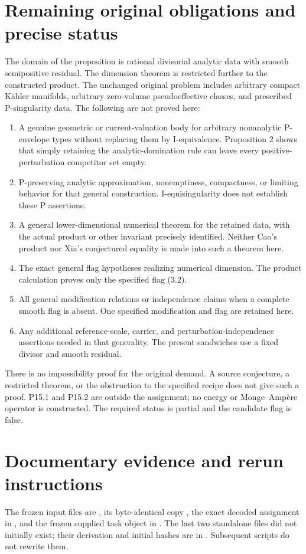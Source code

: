 \documentclass[11pt]{article}
\begin{document}
\section{Remaining original obligations and precise status}
The domain of the proposition is rational divisorial analytic data with smooth semipositive residual. The dimension theorem is restricted further to the constructed product. The unchanged original problem includes arbitrary compact K\"ahler manifolds, arbitrary zero-volume pseudoeffective classes, and prescribed P-singularity data. The following are not proved here:
\begin{enumerate}
\item A genuine geometric or current-valuation body for arbitrary nonanalytic P-envelope types without replacing them by I-equivalence. Proposition 2 shows that simply retaining the analytic-domination rule can leave every positive-perturbation competitor set empty.
\item P-preserving analytic approximation, nonemptiness, compactness, or limiting behavior for that general construction. I-equisingularity does not establish these P assertions.
\item A general lower-dimensional numerical theorem for the retained data, with the actual product or other invariant precisely identified. Neither Cao's product nor Xia's conjectured equality is made into such a theorem here.
\item The exact general flag hypotheses realizing numerical dimension. The product calculation proves only the specified flag (3.2).
\item All general modification relations or independence claims when a complete smooth flag is absent. One specified modification and flag are retained here.
\item Any additional reference-scale, carrier, and perturbation-independence assertions needed in that generality. The present sandwiches use a fixed divisor and smooth residual.
\end{enumerate}
There is no impossibility proof for the original demand. A source conjecture, a restricted theorem, or the obstruction to the specified recipe does not give such a proof. P15.1 and P15.2 are outside the assignment; no energy or Monge--Amp\`ere operator is constructed. The required status is partial and the candidate flag is false.

\section{Documentary evidence and rerun instructions}
The frozen input files are , its byte-identical copy , the exact decoded assignment in , and the frozen supplied task object in . The last two standalone files did not initially exist; their derivation and initial hashes are in . Subsequent scripts do not rewrite them.
\end{document}
